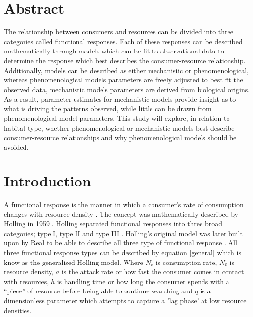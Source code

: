 \documentclass[a4paper]{article}
\numberwithin{equation}{section}
\begin{document}
\linenumbers
\section{Abstract}
The relationship between consumers and resources can be divided into three categories called functional responses.  Each of these responses can be described mathematically through models which can be fit to observational data to determine the response which best describes the consumer-resource relationship.  
Additionally, models can be described as either mechanistic or phenomenological, whereas phenomenological models parameters are freely adjusted to best fit the observed data, mechanistic models parameters are derived from biological origins.  As a result, parameter estimates for mechanistic models provide insight as to what is driving the patterns observed, while little can be drawn from phenomenological model parameters.
\newline
This study will explore, in relation to habitat type, whether phenomenological or mechanistic models best describe consumer-resource relationships and why phenomenological models should be avoided.



\section{Introduction}

A functional response is the manner in which a consumer's rate of consumption changes with resource density \citep{Dunn2020}.   The concept was mathematically described by Holling in 1959 \citep{Holling1959, Holling1959a} .  Holling separated functional responses into three broad categories; type I, type II and type III \citep{Holling1959, Holling1959a}.  Holling's original model was later built upon by Real to be able to describe all three type of functional response \citep{Real1977, Real1979}.  All three functional response types can be described by equation \ref{general} which is know as the generalised Holling model.
\newline
Where $N_e$ is consumption rate, $N_0$ is resource density, $a$ is the attack rate or how fast the consumer comes in contact with resources, $h$ is handling time or how long the consumer spends with a “piece” of resource before being able to continue searching and $q$ is a dimensionless parameter which attempts to capture a 'lag phase' at low resource densities.
\end{document}

